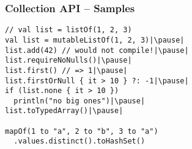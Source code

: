 \begin{frame}[fragile] \frametitle{Collection API -- Samples}
\pause
\begin{lstlisting}
// val list = listOf(1, 2, 3)
val list = mutableListOf(1, 2, 3)|\pause|
list.add(42) // would not compile!|\pause|
list.requireNoNulls()|\pause|
list.first() // => 1|\pause|
list.firstOrNull { it > 10 } ?: -1|\pause|
if (list.none { it > 10 })
  println("no big ones")|\pause|
list.toTypedArray()|\pause|

mapOf(1 to "a", 2 to "b", 3 to "a")
  .values.distinct().toHashSet()
\end{lstlisting}
\end{frame}


